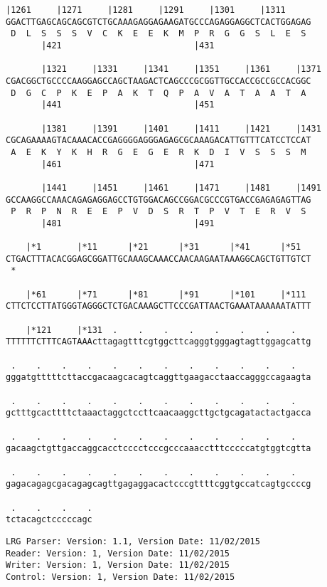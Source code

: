 \documentclass{article}
\begin{document}
\newpage
\begin{Verbatim}[fontfamily=courier]
       |1261     |1271     |1281     |1291     |1301     |1311
GGACTTGAGCAGCAGCGTCTGCAAAGAGGAGAAGATGCCCAGAGGAGGCTCACTGGAGAG
 D  L  S  S  S  V  C  K  E  E  K  M  P  R  G  G  S  L  E  S 
       |421                          |431                   

       |1321     |1331     |1341     |1351     |1361     |1371
CGACGGCTGCCCCAAGGAGCCAGCTAAGACTCAGCCCGCGGTTGCCACCGCCGCCACGGC
 D  G  C  P  K  E  P  A  K  T  Q  P  A  V  A  T  A  A  T  A 
       |441                          |451                   

       |1381     |1391     |1401     |1411     |1421     |1431
CGCAGAAAAGTACAAACACCGAGGGGAGGGAGAGCGCAAAGACATTGTTTCATCCTCCAT
 A  E  K  Y  K  H  R  G  E  G  E  R  K  D  I  V  S  S  S  M 
       |461                          |471                   

       |1441     |1451     |1461     |1471     |1481     |1491
GCCAAGGCCAAACAGAGAGGAGCCTGTGGACAGCCGGACGCCCGTGACCGAGAGAGTTAG
 P  R  P  N  R  E  E  P  V  D  S  R  T  P  V  T  E  R  V  S 
       |481                          |491                   

    |*1       |*11      |*21      |*31      |*41      |*51  
CTGACTTTACACGGAGCGGATTGCAAAGCAAACCAACAAGAATAAAGGCAGCTGTTGTCT
 *   

    |*61      |*71      |*81      |*91      |*101     |*111 
CTTCTCCTTATGGGTAGGGCTCTGACAAAGCTTCCCGATTAACTGAAATAAAAAATATTT

    |*121     |*131  .    .    .    .    .    .    .    .   
TTTTTTCTTTCAGTAAActtagagtttcgtggcttcagggtgggagtagttggagcattg

 .    .    .    .    .    .    .    .    .    .    .    .   
gggatgtttttcttaccgacaagcacagtcaggttgaagacctaaccagggccagaagta

 .    .    .    .    .    .    .    .    .    .    .    .   
gctttgcacttttctaaactaggctccttcaacaaggcttgctgcagatactactgacca

 .    .    .    .    .    .    .    .    .    .    .    .   
gacaagctgttgaccaggcacctcccctcccgcccaaacctttcccccatgtggtcgtta

 .    .    .    .    .    .    .    .    .    .    .    .   
gagacagagcgacagagcagttgagaggacactcccgttttcggtgccatcagtgccccg

 .    .    .    .
tctacagctcccccagc
\end{Verbatim}
\newpage
\begin{Verbatim}[fontfamily=courier]
LRG Parser: Version: 1.1, Version Date: 11/02/2015
Reader: Version: 1, Version Date: 11/02/2015
Writer: Version: 1, Version Date: 11/02/2015
Control: Version: 1, Version Date: 11/02/2015
\end{Verbatim}
\end{document}

